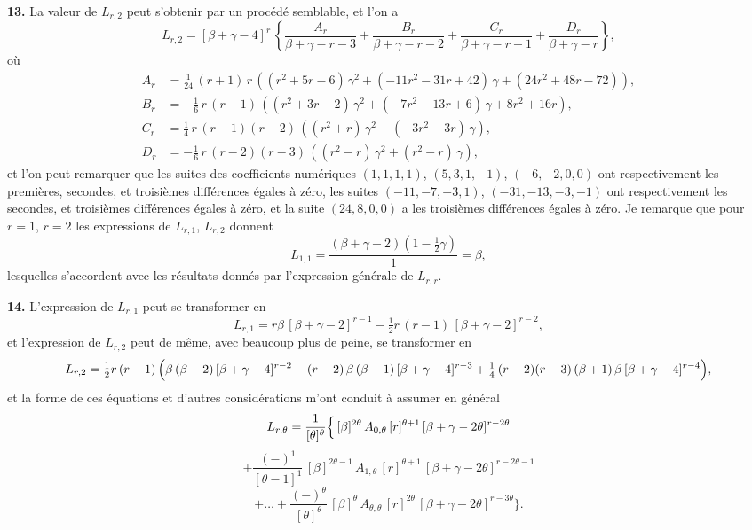 \documentclass[11pt]{article}
\begin{document}
\textbf{13.} La valeur de $L_{r,2}$ peut s'obtenir par un procédé semblable, et l'on a
\[
L_{r,2} = [\beta + \gamma - 4]^{r}\,\left\{\frac{A_r}{\beta + \gamma - r - 3} + \frac{B_r}{\beta + \gamma - r - 2} + \frac{C_r}{\beta + \gamma - r - 1} + \frac{D_r}{\beta + \gamma - r}\right\},
\]
où
\begin{align*}
A_r &= \tfrac{1}{24}\,(r+1)\,r\,((r^2 + 5r - 6)\,\gamma^2 + (-11r^2 - 31r + 42)\,\gamma + (24r^2 + 48r - 72)),\\
B_r &= -\tfrac{1}{6}\,r\,(r-1)\,((r^2 + 3r - 2)\,\gamma^2 + (-7r^2 - 13r + 6)\,\gamma + 8r^2 + 16r),\\
C_r &= \tfrac{1}{4}\,r\,(r-1)(r-2)\,((r^2 + r)\,\gamma^2 + (-3r^2 - 3r)\,\gamma),\\
D_r &= -\tfrac{1}{6}\,r\,(r-2)(r-3)\,((r^2 - r)\,\gamma^2 + (r^2 - r)\,\gamma),
\end{align*}
et l'on peut remarquer que les suites des coefficients numériques $(1, 1, 1, 1)$, $(5, 3, 1, -1)$, $(-6, -2, 0, 0)$ ont respectivement les premières, secondes, et troisièmes différences égales à zéro, les suites $(-11, -7, -3, 1)$, $(-31, -13, -3, -1)$ ont respectivement les secondes, et troisièmes différences égales à zéro, et la suite $(24, 8, 0, 0)$ a les troisièmes différences égales à zéro. Je remarque que pour $r = 1$, $r = 2$ les expressions de $L_{r,1}$, $L_{r,2}$ donnent
\[
L_{1,1} = \frac{(\beta+\gamma-2)(1-\tfrac{1}{2}\gamma)}{1} = \beta,
\]
lesquelles s'accordent avec les résultats donnés par l'expression générale de $L_{r,r}$.

\medskip

\textbf{14.} L'expression de $L_{r,1}$ peut se transformer en
\[
L_{r,1} = r\beta\,[\beta + \gamma - 2]^{r-1} - \tfrac{1}{2}r\,(r-1)\,[\beta + \gamma - 2]^{r-2},
\]
et l'expression de $L_{r,2}$ peut de même, avec beaucoup plus de peine, se transformer en
\[
L_{r,2} = \tfrac{1}{2}r\,(r-1)\,\Bigl( \beta\,(\beta-2)\,[\beta + \gamma - 4]^{r-2} - (r-2)\,\beta\,(\beta-1)\,[\beta + \gamma - 4]^{r-3} + \tfrac{1}{4}\,(r-2)(r-3)\,(\beta+1)\,\beta\,[\beta + \gamma - 4]^{r-4}\Bigr),
\]
et la forme de ces équations et d'autres considérations m'ont conduit à assumer en général
\[
L_{r,\theta} = \frac{1}{[\theta]^{\theta}}\Bigl\{\,[\beta]^{2\theta}\,A_{0,\theta}\,[r]^{\theta+1}\,[\beta + \gamma - 2\theta]^{r-2\theta}
\]
\[
+ \frac{(-)^{1}}{[\theta - 1]^{1}}\,[\beta]^{2\theta-1}\,A_{1,\theta}\,[r]^{\theta+1}\,[\beta + \gamma - 2\theta]^{r-2\theta-1}
\]
\[
+ \ldots + \frac{(-)^{\theta}}{[\theta]^{\theta}}\,[\beta]^{\theta}\,A_{\theta,\theta}\,[r]^{2\theta}\,[\beta + \gamma - 2\theta]^{r-3\theta}\Bigr\}.
\]
\end{document}
